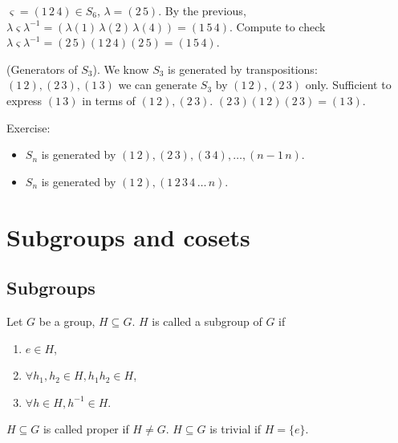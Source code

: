 \documentclass[10pt, a4paper]{article}
\begin{document}
\begin{example}
    $\varsigma = (1\,2\,4) \in S_6$,
    $\lambda = (2\,5)$.
    By the previous,
    $\lambda\varsigma\lambda ^ {-1} = (\lambda(1)\,\lambda(2)\,\lambda(4)) = (1\,5\,4)$.
    Compute to check
    $\lambda\varsigma\lambda ^ {-1} = (2\,5)(1\,2\,4)(2\,5) = (1\,5\,4)$.
\end{example}

\begin{example}
    (Generators of $S_3$).
    We know $S_3$ is generated by transpositions:
    $(1\,2), (2\,3), (1\,3)$ we can generate $S_3$ by $(1\,2), (2\,3)$ only.
    Sufficient to express $(1\,3)$ in terms of $(1\,2), (2\,3)$.
    $(2\,3)(1\,2)(2\,3) = (1\,3)$.
\end{example}

Exercise:
\begin{itemize}
    \item $S_n$ is generated by $(1\,2), (2\,3), (3\,4), \dotsc, (n - 1\, n)$.
    
    \item $S_n$ is generated by $(1\,2), (1\,2\,3\,4\,\dotsc\,n)$.
\end{itemize}

\newpage

\section{Subgroups and cosets}

\subsection{Subgroups}

\begin{definition}
    Let $G$ be a group,
    $H \subseteq G$.
    $H$ is called a subgroup of $G$ if
    
    \begin{enumerate}[label = (\roman*)]
        \item $e \in H$,

        \item $\forall h_1, h_2 \in H, h_1h_2 \in H$,

        \item $\forall h \in H, h ^ {-1} \in H$.
    \end{enumerate}

    $H \subseteq G$ is called proper if $H \neq G$.
    $H \subseteq G$ is trivial if $H = \{e\}$.
\end{definition}
\end{document}
